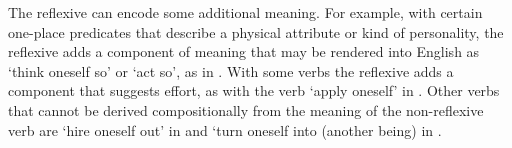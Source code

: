 \documentclass[output=paper]{langscibook}
\begin{document}
The reflexive can encode some additional meaning. For example, with certain one-place predicates that describe a physical attribute or kind of personality, the reflexive adds a component of meaning that may be rendered into English as ‘think oneself so’ or ‘act so’, as in . With some verbs the reflex\-ive adds a component that suggests effort, as with the verb ‘apply oneself’ in . Other verbs that cannot be derived compo\-sitionally from the meaning of the non-reflexive verb are ‘hire oneself out’ in  and ‘turn oneself into (another being) in .
    
    
    
\end{document}
